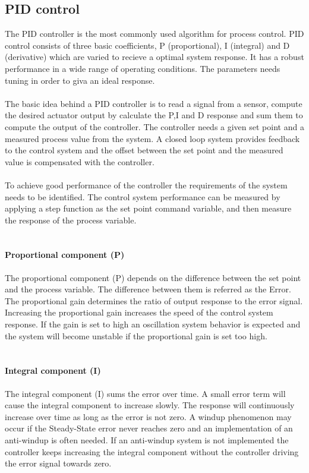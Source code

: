 \subsection{PID control}
The PID controller is the most commonly used algorithm for process control. 
PID control consists of three basic coefficients, P (proportional), I (integral) and D (derivative) which are varied to recieve a optimal system response. It has a robust performance in a wide range of operating conditions. The parameters needs tuning in order to giva an ideal response.\\
\\
The basic idea behind a PID controller is to read a signal from a sensor, compute the desired actuator output by calculate the P,I and D response and sum them to compute the output of the controller. The controller needs a given set point and a measured process value from the system. A closed loop system provides feedback to the control system and the offset between the set point and the measured value is compensated with the controller.
\\
\\
To achieve good performance of the controller the requirements of the system needs to be identified. The control system performance can be measured by applying a step function as the set point command variable, and then measure the response of the process variable.
\\
\\
\paragraph{Proportional component (P)} 
The proportional component (P) depends on the difference between the set point and the process variable. The difference between them is referred as the Error. The proportional gain determines the ratio of output response to the error signal. Increasing the proportional gain increases the speed of the control system response. If the gain is set to high an oscillation system behavior is expected and the system will become unstable if the proportional gain is set too high. 
\\
\\
\paragraph{Integral component (I)}
The integral component (I) sums the error over time. A small error term will cause the integral component to increase slowly. The response will continuously increase over time as long as the error is not zero. A windup phenomenon may occur if the Steady-State error never reaches zero and an implementation of an anti-windup is often needed. If an anti-windup system is not implemented the controller keeps increasing the integral component without the controller driving the error signal towards zero. 
\\
\\
